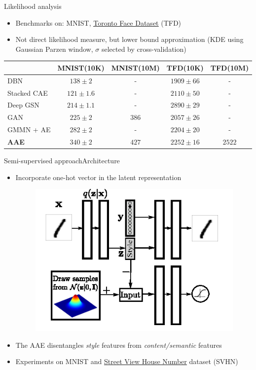 \documentclass[10pt]{beamer}
\begin{document}
\begin{frame}{Likelihood analysis}
\begin{itemize}
  \item Benchmarks on: MNIST, \href{../images/tfd.gif}{\underline{Toronto Face Dataset}} (TFD)
  \item Not direct likelihood measure, but lower bound approximation (KDE using Gaussian Parzen window, $ \sigma $ selected by cross-validation)
\end{itemize}
\begin{table}
  \centering
  \small
  \begin{tabular}{l||c||c||c||c}
  	\toprule
  	             &   MNIST(10K)    & MNIST(10M) &    TFD(10K)     & TFD(10M) \\ \midrule
  	DBN          &  $ 138 \pm 2 $  &     -      & $ 1909 \pm 66 $ &    -     \\
  	Stacked CAE  & $ 121 \pm 1.6 $ &     -      & $ 2110 \pm 50 $ &    -     \\
  	Deep GSN     & $ 214 \pm 1.1 $ &     -      & $ 2890 \pm 29 $ &    -     \\
  	GAN          &  $ 225 \pm 2 $  &  $ 386 $   & $ 2057 \pm 26 $ &    -     \\
  	GMMN + AE    &  $ 282 \pm 2 $  &     -      & $ 2204 \pm 20 $ &    -     \\ \midrule
  	\textbf{AAE} &  $ 340 \pm 2 $  &  $ 427 $   & $ 2252 \pm 16 $ & $ 2522 $ \\ \bottomrule
  \end{tabular}
\end{table}
\end{frame}

\begin{frame}{Semi-supervised approach}{Architecture}
\begin{itemize}
  \item Incorporate one-hot vector in the latent representation
  \begin{figure}
    \centering
    \includegraphics[width=0.6\linewidth]{../images/aae-architecture-02.png}
  \end{figure}
  \item The AAE disentangles \textit{style} features from \textit{content/semantic} features
  \item Experiments on MNIST and \href{../images/svhn.gif}{\underline{Street View House Number}} dataset (SVHN)
\end{itemize}
\end{frame}
\end{document}
